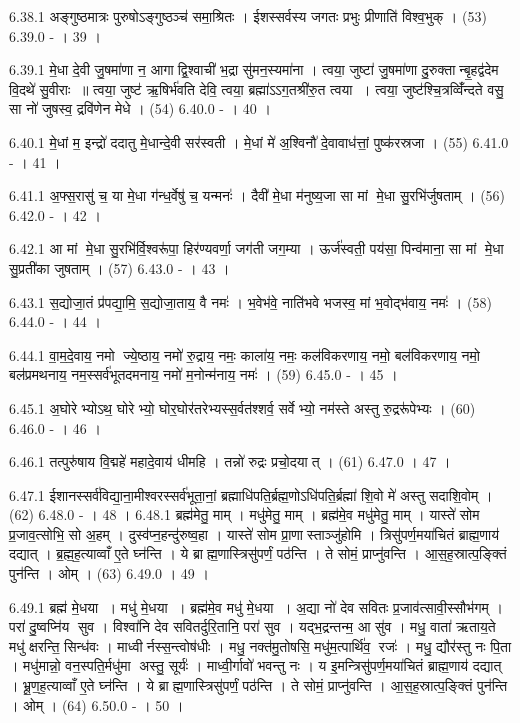 6.38.1
अङ्गुष्ठमात्रः पुरुषोऽङ्गुष्ठञ्च॑ समा॒श्रितः । ईशस्सर्वस्य जगतः प्रभुः प्रीणाति॑ विश्व॒भुक् । (53)
6.39.0
- । 39 ।
\anuvakamend

6.39.1
मे॒धा दे॒वी जु॒षमा॑णा न॒ आगाद्वि॒श्वाची॑ भ॒द्रा सु॑मन॒स्यमा॑ना । त्वया॒ जुष्टा॑ जु॒षमा॑णा दु॒रुक्तान्बृ॒हद्व॑देम वि॒दथे॑ सु॒वीराः ॥ त्वया॒ जुष्ट॑ ऋ॒षिर्भ॑वति देवि॒ त्वया॒ ब्रह्मा॑ऽऽग॒तश्री॑रु॒त त्वया । त्वया॒ जुष्ट॑श्चि॒त्रव्विँ॑न्दते वसु॒ सा नो॑ जुषस्व॒ द्रवि॑णेन मेधे । (54)
6.40.0
- । 40 ।
\anuvakamend

6.40.1
मे॒धां म॒ इन्द्रो॑ ददातु मे॒धान्दे॒वी सर॑स्वती । मे॒धां मे॑ अ॒श्विनौ॑ दे॒वावाध॑त्तां॒ पुष्क॑रस्रजा । (55)
6.41.0
- । 41 ।
\anuvakamend

6.41.1
अ॒फ्स॒रासु॑ च॒ या मे॒धा ग॑न्ध॒र्वेषु॑ च॒ यन्मनः॑ । दैवी॑ मे॒धा म॑नुष्य॒जा सा मां मे॒धा सु॒रभि॑र्जुषताम् । (56)
6.42.0
- । 42 ।
\anuvakamend

6.42.1
आ मां मे॒धा सु॒रभि॑र्वि॒श्वरू॑पा॒ हिर॑ण्यवर्णा॒ जग॑ती जग॒म्या । ऊर्ज॑स्वती॒ पय॑सा॒ पिन्व॑माना॒ सा मां मे॒धा सु॒प्रती॑का जुषताम् । (57)
6.43.0
- । 43 ।
\anuvakamend

6.43.1
स॒द्योजा॒तं प्र॑पद्या॒मि॒ स॒द्योजा॒ताय॒ वै नमः॑ । भ॒वेभ॑वे॒ नाति॑भवे भजस्व॒ मां भ॒वोद्भ॑वाय॒ नमः॑ । (58)
6.44.0
- । 44 ।
\anuvakamend

6.44.1
वा॒म॒दे॒वाय॒ नमो ज्ये॒ष्ठाय॒ नमो॑ रु॒द्राय॒ नमः॒ काला॑य॒ नमः॒ कल॑विकरणाय॒ नमो॒ बल॑विकरणाय॒ नमो॒ बल॑प्रमथनाय॒ नम॒स्सर्व॑भूतदमनाय॒ नमो॑ म॒नोन्म॑नाय॒ नमः॑ । (59)
6.45.0
- । 45 ।
\anuvakamend

6.45.1
अ॒घोरेभ्योऽथ॒ घोरेभ्यो॒ घोर॒घोर॑तरेभ्यस्स॒र्वत॑श्शर्व॒ सर्वेभ्यो॒ नम॑स्ते अस्तु रु॒द्ररू॑पेभ्यः । (60)
6.46.0
- । 46 ।
\anuvakamend

6.46.1
तत्पुरु॑षाय वि॒द्महे॑ महादे॒वाय॑ धीमहि । तन्नो॑ रुद्रः प्रचो॒दयात् । (61)
6.47.0
। 47 ।
\anuvakamend

6.47.1
ईशानस्सर्व॑विद्या॒ना॒मीश्वरस्सर्व॑भूता॒नां॒ ब्रह्माधि॑पति॒र्ब्रह्म॒णोऽधि॑पति॒र्ब्रह्मा॑ शि॒वो मे॑ अस्तु सदाशि॒वोम् । (62)
6.48.0
- । 48 ।
6.48.1
ब्रह्म॑मेतु॒ माम् । मधु॑मेतु॒ माम् । ब्रह्म॑मे॒व मधु॑मेतु॒ माम् । यास्ते॑ सोम प्र॒जाव॒त्सोभि॒ सो अ॒हम् । दुस्व॑प्न॒हन्दु॑रुष्व॒हा । यास्ते॑ सोम प्रा॒णास्ताञ्जु॑होमि । त्रिसु॑पर्ण॒मया॑चितं ब्राह्म॒णाय॑ दद्यात् । ब्र॒ह्म॒ह॒त्याव्वाँ ए॒ते घ्न॑न्ति । ये ब्राह्म॒णास्त्रिसु॑पर्णं॒ पठ॑न्ति । ते सोमं॒ प्राप्नु॑वन्ति । आ॒स॒ह॒स्रात्प॒ङ्क्तिं पुन॑न्ति । ओम् । (63)
6.49.0
। 49 ।
\anuvakamend

6.49.1
ब्रह्म॑ मे॒धया । मधु॑ मे॒धया । ब्रह्म॑मे॒व मधु॑ मे॒धया । अ॒द्या नो॑ देव सवितः प्र॒जाव॑त्सावी॒स्सौभ॑गम् । परा॑ दु॒ष्वप्नि॑य सुव । विश्वा॑नि देव सवितर्दुरि॒तानि॒ परा॑ सुव । यद्भ॒द्रन्तन्म॒ आ सु॑व । मधु॒ वाता॑ ऋताय॒ते मधु॑ क्षरन्ति॒ सिन्ध॑वः । माध्वीर्नस्स॒न्त्वोष॑धीः । मधु॒ नक्त॑मु॒तोषसि॒ मधु॑म॒त्पार्थि॑व॒ रजः॑ । मधु॒ द्यौर॑स्तु नः पि॒ता । मधु॑मान्नो॒ वन॒स्पति॒र्मधु॑मा अस्तु॒ सूर्यः॑ । माध्वी॒र्गावो॑ भवन्तु नः । य इ॒मन्त्रिसु॑पर्ण॒मया॑चितं ब्राह्म॒णाय॑ दद्यात् । भ्रू॒ण॒ह॒त्याव्वाँ ए॒ते घ्न॑न्ति । ये ब्राह्म॒णास्त्रिसु॑पर्णं॒ पठ॑न्ति । ते सोमं॒ प्राप्नु॑वन्ति । आ॒स॒ह॒स्रात्प॒ङ्क्तिं पुन॑न्ति । ओम् । (64)
6.50.0
- । 50 ।
\anuvakamend

